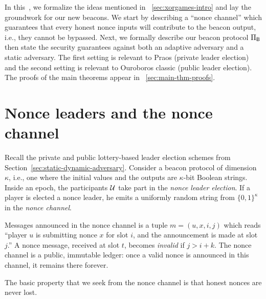 

In this \Section\,, we formalize the ideas mentioned in \Section~\ref{sec:xorgames-intro} 
and lay the groundwork for our new beacons. 
We start by describing a ``nonce channel'' which guarantees that 
every honest nonce inputs will contribute to the beacon output, 
i.e., they cannot be bypassed. 
Next, we formally describe our beacon protocol $\Pi_{\mathsf{B}}$ 
then state the security guarantees against both an adaptive adversary 
and a static adversary. 
The first setting is relevant to Praos (private leader election) 
and the second setting 
is relevant to Ouroboros classic (public leader election). 
The proofs of the main theorems appear in \Section~\ref{sec:main-thm-proofs}.


\section{Nonce leaders and the nonce channel}
Recall the private and public lottery-based leader election schemes 
from Section~\ref{sec:static-dynamic-adversary}. 
Consider a beacon protocol of dimension $\kappa$, 
i.e., one where the initial values and the outputs are $\kappa$-bit Boolean strings. 
Inside an epoch, 
the participants $\mathcal{U}$ take part in the \emph{nonce leader election}. 
If a player is elected a nonce leader, 
he emits a uniformly random string from $\{0,1\}^\kappa$  
in the \emph{nonce channel}. 

\begin{definition}\label{def:nonce-channel}
  Messages announced in the nonce channel is a tuple $m = (u, x, i, j)$ 
  which reads ``player $u$ is submitting nonce $x$ for slot $i$, 
  and the announcement is made at slot $j$.''
  A nonce message, received at slot $t$, becomes \emph{invalid} 
  if $j > i + k$.
  The nonce channel is a public, immutable ledger: 
  once a valid nonce is announced in this channel, 
  it remains there forever. 
\end{definition}
\noindent
The basic property that we seek from the nonce channel is that 
honest nonces are never lost. 


